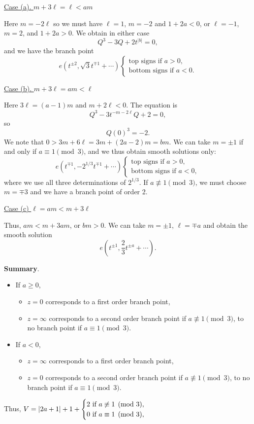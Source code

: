 \documentclass[a4paper,11pt]{article}
\begin{document}
\begin{mdframed}
\underline{Case (a). $m+3\ell = \ell < am$}

Here $m = -2\ell$ so we must have $\ell = 1$, $m = -2$ and $1 + 2a <
0$, or $\ell = -1$, $m = 2$, and $1 + 2a > 0$.  We obtain in either
case
$$
Q^3 - 3Q + 2t^{|b|} = 0,
$$
and we have the branch point
$$
e(t^{\pm 2}, \sqrt{3} t^{\mp 1} + \cdots)
\begin{cases}
  \text{top signs if } a > 0,\\
  \text{bottom signs if } a < 0.
\end{cases}
$$

\underline{Case (b). $m+3\ell = am < \ell$}

Here $3 \ell = (a-1)m$ and $m + 2\ell < 0$.  The equation is
$$
Q^3 - 3t^{-m - 2\ell} Q + 2 = 0,
$$
so
$$
Q(0)^3 = -2.
$$
We note that $0 > 3m + 6\ell = 3m + (2a-2)m = bm$.  We can take $m =
\pm 1$ if and only if $a \equiv 1 \pmod{3}$, and we thus obtain smooth
solutions only:
$$
e(t^{\mp 1}, -2^{1/3} t^{\mp 1} + \cdots)
\begin{cases}
  \text{top signs if } a > 0,\\
  \text{bottom signs if } a < 0,
\end{cases}
$$
where we use all three determinations of $2^{1/3}$.  If $a \not\equiv
1 \pmod{3}$, we must choose $m = \mp 3$ and we have a branch point of
order 2.

\underline{Case (c) $\ell = am < m + 3\ell$}

Thus, $am < m + 3am$, or $bm > 0$.  We can take $m = \pm 1$, $\ell =
\mp a$ and obtain the smooth solution
$$
e(t^{\pm 1}, \frac{2}{3}t^{\pm a} + \cdots).
$$

\textbf{Summary}.
\begin{itemize}
\item If $a \ge 0$,
  \begin{itemize}
  \item $z = 0$ corresponds to a first order branch point,
  \item $z = \infty$ corresponds to a second order branch point if $a
    \not\equiv 1 \pmod{3}$, to no branch point if $a \equiv 1
    \pmod{3}$.
  \end{itemize}
\item If $a < 0$,
  \begin{itemize}
  \item $z = \infty$ corresponds to a first order branch point,
  \item $z = 0$ corresponds to a second order branch point if $a
    \not\equiv 1 \pmod{3}$, to no branch point if $a \equiv 1
    \pmod{3}$.
  \end{itemize}
\end{itemize}
Thus, $\displaystyle V = |2a+1| + 1 +
\begin{cases}
  2\text{ if } a \not\equiv 1 \pmod{3},\\
  0\text{ if } a \equiv 1 \pmod{3},
\end{cases}
$


\end{mdframed}
\end{document}
